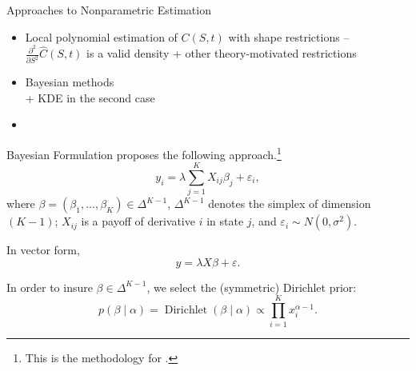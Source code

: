 \documentclass[10pt,aspectratio=43]{beamer}
\begin{document}
\begin{frame}{Approaches to Nonparametric Estimation}

    \begin{itemize}  \setlength\itemsep{1em}
        \item Local polynomial estimation of $C(S,t)$ with shape restrictions --\\ $\frac{\partial^2}{\partial S^2}\hat C(S,t)$ is a valid density + other theory-motivated restrictions \\ {\scriptsize\parencite{ait-sahaliaNonparametricOptionPricing2003,leeEstimationRiskneutralMeasures2014}}
        \item Bayesian methods \\{\scriptsize\parencite{fisherSimplexRegression2016, hardleStatePriceDensities2015,tabogaOptionimpliedProbabilityDistributions2016} + KDE in the second case}
        \item 
    \end{itemize}
\end{frame}

\begin{frame}{Bayesian Formulation}
    \cite{fisherSimplexRegression2016} proposes the following approach.\footnote[frame]{\tiny This is the methodology for \cite{MarketProbabilityTracker}.}
\vspace{-2ex}
    \[y_i=\lambda\sum_{j=1}^KX_{ij}\beta_j+\varepsilon_i,\]
    where $\beta=(\beta_1,\dots, \beta_K)\in \Delta^{K-1}$, $\Delta^{K-1}$ denotes the simplex of dimension $(K-1)$; $X_{ij}$ is a payoff of derivative $i$ in state $j$, and $\varepsilon_i\sim N(0,\sigma^2)$.

    In vector form,
    \[y=\lambda X \beta+\varepsilon.\]

\vspace{-2ex}
    In order to insure $\beta\in \Delta^{K-1}$, we select the (symmetric) Dirichlet prior:
    \[p(\beta\mid \alpha)=\operatorname{Dirichlet}(\beta\mid \alpha)\propto \prod_{i=1}^{K}x_{i}^{\alpha-1}.\]

\end{frame}
\end{document}
